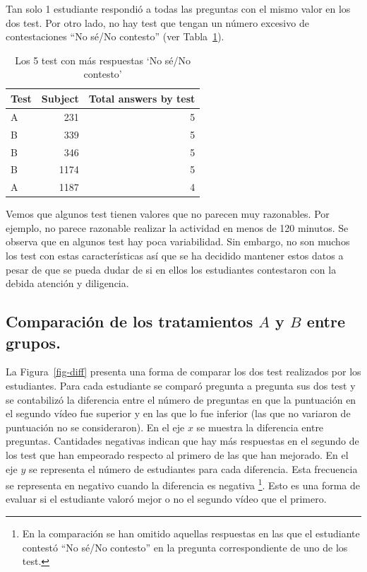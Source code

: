 \documentclass[
  12pt,
  a4paper,
  extrafontsizes,
  onecolumn,
  openright,
  table]{memoir}
\begin{document}
Tan solo 1 estudiante respondió a todas las preguntas con el mismo valor
en los dos test. Por otro lado, no hay test que tengan un número
excesivo de contestaciones \enquote{No sé/No contesto} (ver
Tabla~\ref{tbl-noanswer}).

\hypertarget{tbl-noanswer}{}
\begin{longtable}{lrr}
\caption{\label{tbl-noanswer}Los 5 test con más respuestas `No sé/No contesto' }\tabularnewline

\toprule
Test & Subject & Total answers by test \\ 
\midrule
A & 231 & 5 \\ 
B & 339 & 5 \\ 
B & 346 & 5 \\ 
B & 1174 & 5 \\ 
A & 1187 & 4 \\ 
\bottomrule
\end{longtable}

Vemos que algunos test tienen valores que no parecen muy razonables. Por
ejemplo, no parece razonable realizar la actividad en menos de 120
minutos. Se observa que en algunos test hay poca variabilidad. Sin
embargo, no son muchos los test con estas características así que se ha
decidido mantener estos datos a pesar de que se pueda dudar de si en
ellos los estudiantes contestaron con la debida atención y diligencia.

\hypertarget{sec-eda-3}{%
\subsection{\texorpdfstring{Comparación de los tratamientos \(A\) y
\(B\) entre
grupos.}{Comparación de los tratamientos A y B entre grupos.}}\label{sec-eda-3}}

La Figura~\ref{fig-diff} presenta una forma de comparar los dos test
realizados por los estudiantes. Para cada estudiante se comparó pregunta
a pregunta sus dos test y se contabilizó la diferencia entre el número
de preguntas en que la puntuación en el segundo vídeo fue superior y en
las que lo fue inferior (las que no variaron de puntuación no se
consideraron). En el eje \(x\) se muestra la diferencia entre preguntas.
Cantidades negativas indican que hay más respuestas en el segundo de los
test que han empeorado respecto al primero de las que han mejorado. En
el eje \(y\) se representa el número de estudiantes para cada
diferencia. Esta frecuencia se representa en negativo cuando la
diferencia es negativa \footnote{En la comparación se han omitido
  aquellas respuestas en las que el estudiante contestó \enquote{No
  sé/No contesto} en la pregunta correspondiente de uno de los test.}.
Esto es una forma de evaluar si el estudiante valoró mejor o no el
segundo vídeo que el primero.
\end{document}
